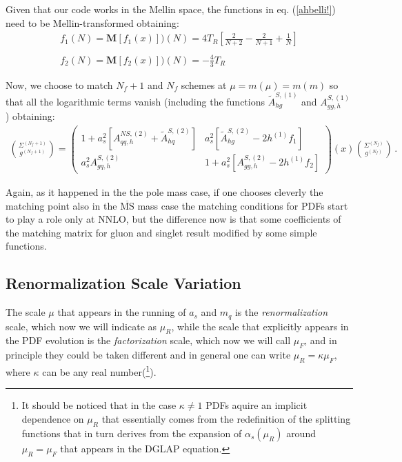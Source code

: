 \documentclass[10pt,a4paper]{article}
\begin{document}
Given that our code works in the Mellin space, the functions in eq. (\ref{ahbelli!}) need to be Mellin-transformed obtaining:
\begin{equation}\label{ahbellissimi!}
\begin{array}{l}
\displaystyle f_1(N) = \mathbf{M}[f_1(x)])(N)= 4 T_R\left[\frac2{N+2}-\frac2{N+1}+\frac1N\right]\\
\\
\displaystyle f_2(N) = \mathbf{M}[f_2(x)])(N)= -\frac43 T_R
\end{array}
\end{equation}

Now, we choose to match $N_f+1$ and $N_f$ schemes at $\mu = m(\mu) = m(m)$ so that all the logarithmic terms vanish (including the functions $\tilde{A}^{S,(1)}_{hg}$ and $A_{gg,h}^{S,(1)}$) obtaining:
\begin{equation}
\begin{array}{c}
\displaystyle {\Sigma^{(N_f+1)}\choose g^{(N_f+1)}}=\begin{pmatrix}1+a_s^2[A_{qq,h}^{N\!S,(2)}+\tilde{A}^{S,(2)}_{hq}] & a_s^2[\tilde{A}^{S,(2)}_{hg}-2h^{(1)}f_1]\\
a_s^2A^{S,(2)}_{gq,h} & 1+a_s^2[A_{gg,h}^{S,(2)}-2h^{(1)}f_2]\end{pmatrix}(x){\Sigma^{(N_f)} \choose g^{(N_f)}}\,.
\end{array}
\end{equation}

Again, as it happened in the the pole mass case, if one chooses cleverly the matching point also in the $\overline{\mbox{MS}}$ mass case the matching conditions for PDFs start to play a role only at NNLO, but the difference now is that some coefficients of the matching matrix for gluon and singlet result modified by some simple functions.

\subsection{Renormalization Scale Variation}

The scale $\mu$ that appears in the running of $a_s$ and $m_q$ is the
\textit{renormalization} scale, which now we will indicate as $\mu_R$,
while the scale that explicitly appears in the PDF evolution is the
\textit{factorization} scale, which now we will call $\mu_F$, and in
principle they could be taken different and in general one can write
$\mu_R = \kappa \mu_F$, where $\kappa$ can be any real
number(\footnote{It should be noticed that in the case $\kappa\neq1$
PDFs aquire an implicit dependence on $\mu_R$ that essentially comes
from the redefinition of the splitting functions that in turn derives
from the expansion of $\alpha_s(\mu_R)$ around $\mu_R=\mu_F$ that
appears in the DGLAP equation.}).
\end{document}

